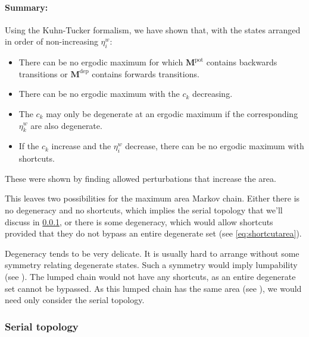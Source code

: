 \documentclass[12pt]{article}
\newcommand{\etwm}{\eta^w}
\newcommand{\MMdm}{M}
\newcommand{\MMd}{\mathbf{\MMdm}}
\newcommand{\pot}{^{\text{pot}}}
\newcommand{\dep}{^{\text{dep}}}
\begin{document}
\paragraph{Summary:}\label{sec:pertsummary}

Using the Kuhn-Tucker formalism, we have shown that,
with the states arranged in order of non-increasing $\etwm_i$:
%
\begin{itemize}
  \item There can be no ergodic maximum for which $\MMd\pot$ contains backwards transitions or $\MMd\dep$ contains forwards transitions.
  \item There can be no ergodic maximum with the $c_k$ decreasing.
  \item The $c_k$ may only be degenerate at an ergodic maximum if the corresponding $\etwm_k$ are also degenerate.
  \item If the $c_k$ increase and the $\etwm_i$ decrease, there can be no ergodic maximum with shortcuts.
\end{itemize}
%
These were shown by finding allowed perturbations that increase the area.

This leaves two possibilities for the maximum area Markov chain.
Either there is no degeneracy and no shortcuts, which implies the serial topology that we'll discuss in \cref{sec:serialarea}, or there is some degeneracy, which would allow shortcuts provided that they do not bypass an entire degenerate set (see \cref{eq:shortcutarea}).

Degeneracy tends to be very delicate. 
It is usually hard to arrange without some symmetry relating degenerate states. 
Such a symmetry would imply lumpability (see \cite{kemeny1960finite,Ball1993Lumpability,burke1958markovian}). 
The lumped chain would not have any shortcuts, as an entire degenerate set cannot be bypassed. 
As this lumped chain has the same area (see \cite{Lahiri2013synapse}), we would need only consider the serial topology.

\subsubsection{Serial topology}\label{sec:serialarea}
\end{document}
